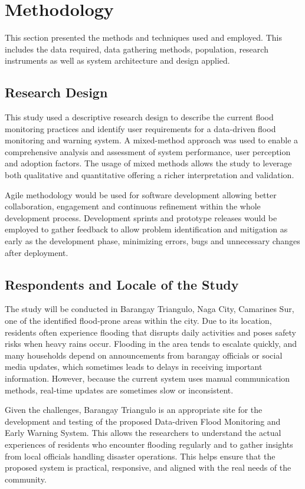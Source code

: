 \documentclass{research}
\begin{document}
\chapter{Methodology}

This section presented the methods and techniques used and employed. This includes the data required, data gathering methods, population, research instruments as well as system architecture and design applied.

\section{Research Design}

This study used a descriptive research design to describe the current flood monitoring practices and identify user requirements for a data-driven flood monitoring and warning system. A mixed-method approach was used to enable a comprehensive analysis and assessment of system performance, user perception and adoption factors. The usage of mixed methods allows the study to leverage both qualitative and quantitative offering a richer interpretation and validation.

Agile methodology would be used for software development allowing better collaboration, engagement and continuous refinement within the whole development process. Development sprints and prototype releases would be employed to gather feedback to allow problem identification and mitigation as early as the development phase, minimizing errors, bugs and unnecessary changes after deployment.

\section{Respondents and Locale of the Study}

The study will be conducted in Barangay Triangulo, Naga City, Camarines Sur, one of the identified flood-prone areas within the city. Due to its location, residents often experience flooding that disrupts daily activities and poses safety risks when heavy rains occur. Flooding in the area tends to escalate quickly, and many households depend on announcements from barangay officials or social media updates, which sometimes leads to delays in receiving important information. However, because the current system uses manual communication methods, real-time updates are sometimes slow or inconsistent.

Given the challenges, Barangay Triangulo is an appropriate site for the development and testing of the proposed Data-driven Flood Monitoring and Early Warning System. This allows the researchers to understand the actual experiences of residents who encounter flooding regularly and to gather insights from local officials handling disaster operations. This helps ensure that the proposed system is practical, responsive, and aligned with the real needs of the community.
\end{document}

